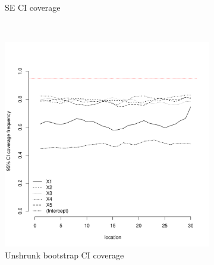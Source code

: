 \documentclass[authoryear, review, 11pt]{elsarticle}
\begin{document}
\begin{figure}
\begin{subfigure}[b]{0.45\textwidth}
		\caption{SE CI coverage}
	\end{subfigure}%
	\\%
	\begin{subfigure}[b]{0.45\textwidth}
	\centering
		\includegraphics[width=\textwidth]{../../figures/simulation/15.24.profile_unshrunk_bootstrap_coverage.pdf}
		\caption{Unshrunk bootstrap CI coverage}
	\end{subfigure}%
	~ %
	\begin{subfigure}[b]{0.45\textwidth}
	\centering

\end{subfigure}
\end{figure}
\end{document}
